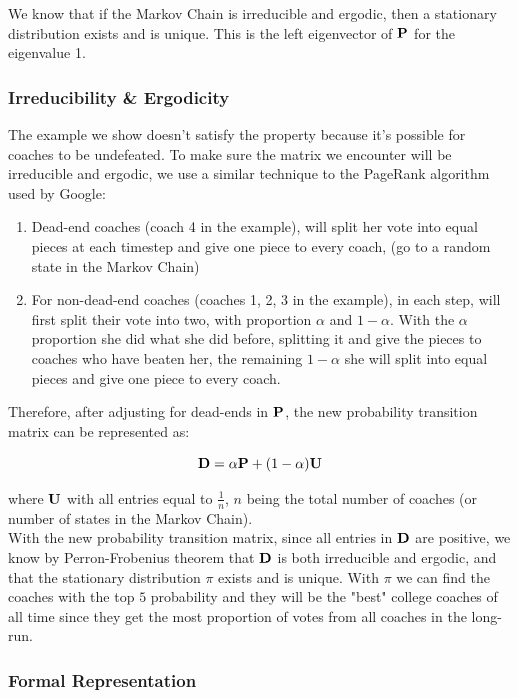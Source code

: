\documentclass[11pt,notitlepage]{article}
\begin{document}
\noindent We know that if the Markov Chain is irreducible and ergodic, then a stationary distribution exists and is unique. This is the left eigenvector of $\bf{P}$ for the eigenvalue 1.


\subsubsection*{Irreducibility \& Ergodicity}

\noindent The example we show doesn't satisfy the property because it's possible for coaches to be undefeated. To make sure the matrix we encounter will be irreducible and ergodic, we use a similar technique to the PageRank\cite{Pagerank} algorithm used by Google:

\begin{enumerate}
\item Dead-end coaches (coach 4 in the example), will split her vote into equal pieces at each timestep and give one piece to every coach, (go to a random state in the Markov Chain)
\item For non-dead-end coaches (coaches 1, 2, 3 in the example), in each step, will first split their vote into two, with proportion $\alpha$ and $1 - \alpha$. With the $\alpha$ proportion she did what she did before, splitting it and give the pieces to coaches who have beaten her, the remaining $1 - \alpha$ she will split into equal pieces and give one piece to every coach.
\end{enumerate}

\noindent Therefore, after adjusting for dead-ends in ${\bf P}$, the new probability transition matrix can be represented as:

$${\bf D} = \alpha {\bf P} + (1 - \alpha) {\bf U}$$

\noindent where $\bf{U}$ with all entries equal to $\frac{1}{n}$, $n$ being the total number of coaches (or number of states in the Markov Chain).
\\

\noindent With the new probability transition matrix, since all entries in $\bf{D}$ are positive, we know by Perron-Frobenius theorem that $\bf{D}$ is both irreducible and ergodic, and that the stationary distribution $\pi$ exists and is unique. With $\pi$ we can find the coaches with the top $5$ probability and they will be the "best" college coaches of all time since they get the most proportion of votes from all coaches in the long-run.

\subsubsection*{Formal Representation}
\end{document}
